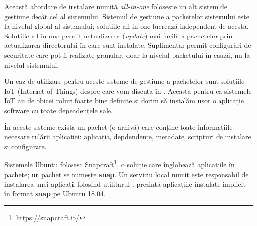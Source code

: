 Această abordare de instalare numită \textit{all-in-one} folosește un alt sistem de gestiune decât cel al sistemului.
Sistemul de gestiune a pachetelor sistemului este la nivelul global al sistemului;
soluțiile all-in-one lucrează independent de acesta.
Soluțiile all-in-one permit actualizarea (\textit{update}) mai facilă a pachetelor prin actualizarea directorului în care sunt instalate.
Suplimentar permit configurări de securitate care pot fi realizate granular, doar la nivelul pachetului în cauză, nu la nivelul sistemului.

Un caz de utilizare pentru aceste sisteme de gestiune a pachetelor sunt soluțiile IoT (Internet of Things) despre care vom discuta în .
Aceasta pentru că sistemele IoT au de obicei roluri foarte bine definite și dorim să instalăm ușor o aplicație software cu toate dependențele sale.

În aceste sisteme există un pachet (o arhivă) care conține toate informațiile necesare rulării aplicației: aplicația, depdendențe, metadate, scripturi de instalare și configurare.

Sistemele Ubuntu folosesc Snapcraft\footnote{\url{https://snapcraft.io/}}, o soluție care înglobează aplicațiile în pachete;
un pachet se numește \textbf{snap}.
Un serviciu local numit  este responsabil de instalarea unei aplicații folosind utilitarul .
 prezintă aplicațiile instalate implicit în format \textbf{snap} pe Ubuntu 18.04.


